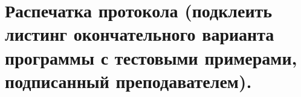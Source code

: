 \section{Распечатка протокола \textnormal{\small (подклеить листинг окончательного варианта программы с тестовыми примерами, подписанный преподавателем).}}

\newpage